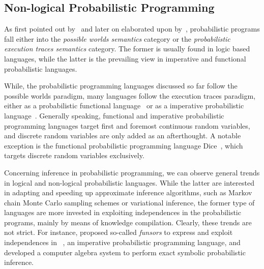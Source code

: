 

\subsection{Non-logical Probabilistic Programming}

As first pointed out by~\citet{russell2015unifying} and later on elaborated upon by~\citet{kimmig2017probabilistic}, probabilistic programs fall either into the {\em possible worlds semantics} category or the {\em probabilistic execution traces semantics} category. The former is usually found in logic based languages, while the latter is the prevailing view in imperative and functional probabilistic languages.

While, the probabilistic programming languages discussed so far follow the possible worlds paradigm,
many languages follow the execution traces paradigm, either as a probabilistic functional language~\citep{goodman2008church,wood2014approach} or as a imperative probabilistic language~\citep{gehr2016psi,salvatier2016probabilistic,carpenter2017stan,bingham2019pyro,ge2018turing}. Generally speaking, functional and imperative probabilistic programming languages target first and foremost continuous random variables, and discrete random variables are only added as an afterthought. A notable exception is the functional probabilistic programming language Dice~\citep{holtzen2020dice}, which targets discrete random variables exclusively.

Concerning inference in probabilistic programming, we can observe general trends in logical and non-logical probabilistic languages. While the latter are interested in adapting and speeding up approximate inference algorithms, such as Markov chain Monte Carlo sampling schemes or variational inference, the former type of languages are more invested in exploiting independences in the probabilistic programs, mainly by means of knowledge compilation. Clearly, these trends are not strict. For instance, \citet{obermeyer2019functional} proposed so-called {\em funsors} to express and exploit independences in \pyrosty~\citep{bingham2019pyro}, an imperative probabilistic programming language, and \citet{gehr2016psi} developed a computer algebra system to perform exact symbolic probabilistic inference.


